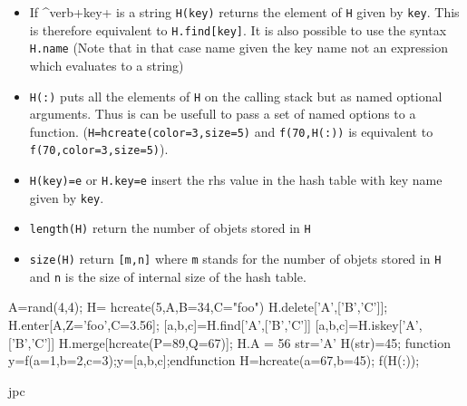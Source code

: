\begin{itemize}
\item If ^verb+key+ is a string \verb+H(key)+ returns the element of \verb+H+ given by \verb+key+. 
  This is therefore equivalent to \verb+H.find[key]+. It is also possible to use 
  the syntax \verb+H.name+ (Note that in that case name given the key name not an expression 
  which evaluates to a string) 
\item \verb+H(:)+ puts all the elements of \verb+H+ on the calling stack but as named 
  optional arguments. Thus is can be usefull to pass a set of named options to a function. 
  (\verb+H=hcreate(color=3,size=5)+ and \verb+f(70,H(:))+ is equivalent to 
  \verb+f(70,color=3,size=5)+).
\item \verb+H(key)=e+ or \verb+H.key=e+ insert the rhs value in the hash table with key name 
  given by \verb+key+.
\end{itemize}

\begin{itemize}
   \item \verb+length(H)+ return the number of objets stored in \verb+H+
   \item \verb+size(H)+ return \verb+[m,n]+ where \verb+m+ stands for the number 
     of objets stored in \verb+H+ and \verb+n+ is the size of internal size of 
     the hash table. 
\end{itemize}

\begin{examples}
  \begin{program}
    A=rand(4,4);
    H= hcreate(5,A,B=34,C="foo")
    H.delete['A',['B','C']];
    H.enter[A,Z='foo',C=3.56];
    [a,b,c]=H.find['A',['B','C']]
    [a,b,c]=H.iskey['A',['B','C']]
    H.merge[hcreate(P=89,Q=67)];
    H.A = 56 
    str='A'
    H(str)=45;
    function y=f(a=1,b=2,c=3);y=[a,b,c];endfunction 
    H=hcreate(a=67,b=45);
    f(H(:));
  \end{program}
 \end{examples}

\begin{authors}
  jpc
\end{authors}
